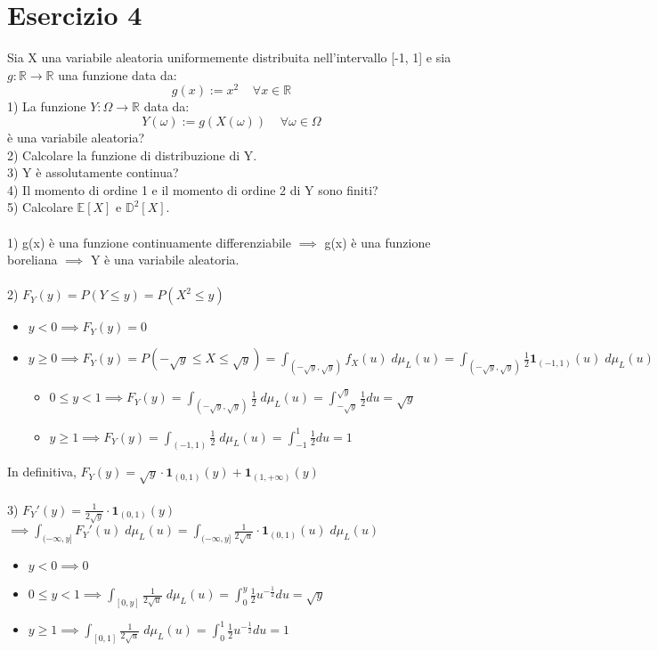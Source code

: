 \documentclass{article}
\begin{document}
\section*{Esercizio 4}
Sia X una variabile aleatoria uniformemente distribuita nell'intervallo [-1, 1] e sia $g: \mathbb{R} \to \mathbb{R}$ una funzione data da:
\[ g(x) := x^{2} \; \; \; \; \forall x \in \mathbb{R} \]
1) La funzione $Y: \Omega \to \mathbb{R}$ data da:
\[ Y(\omega) := g(X(\omega)) \; \; \; \; \forall \omega \in \Omega \]
è una variabile aleatoria?\\
2) Calcolare la funzione di distribuzione di Y.\\
3) Y è assolutamente continua?\\
4) Il momento di ordine 1 e il momento di ordine 2 di Y sono finiti?\\
5) Calcolare $\mathbb{E}[X]$ e $\mathbb{D}^{2}[X]$.\\
\\
1) g(x) è una funzione continuamente differenziabile $\implies$ g(x) è una funzione boreliana $\implies$ Y è una variabile aleatoria.\\
\\
2) $F_{Y}(y) = P(Y \leq y) = P(X^{2} \leq y)$
\begin{itemize}
\item $y<0 \implies F_{Y}(y)=0$
\item $y\geq 0 \implies  F_{Y}(y)= P(-\sqrt{y} \leq X \leq \sqrt{y}) = \int_{(-\sqrt{y},\sqrt{y})}^{}f_{X}(u) \; d\mu_{L}(u) = \int_{(-\sqrt{y},\sqrt{y})}^{}\frac{1}{2}\mathbf{1}_{(-1,1)}(u) \; d\mu_{L}(u)$
	\begin{itemize}
	\item $0 \leq y<1 \implies F_{Y}(y)=\int_{(-\sqrt{y},\sqrt{y})}^{}\frac{1}{2} \; d\mu_{L}(u) = \int_{-\sqrt{y}}^{\sqrt{y}}\frac{1}{2}du = \sqrt{y}$
	\item $y \geq 1 \implies F_{Y}(y)=\int_{(-1,1)}^{}\frac{1}{2} \; d\mu_{L}(u) = \int_{-1}^{1}\frac{1}{2}du = 1$
	\end{itemize}
\end{itemize}
In definitiva, $F_{Y}(y) = \sqrt{y}\cdot \mathbf{1}_{(0,1)}(y)+\mathbf{1}_{(1,+\infty)}(y)$\\
\\
3) $F_{Y}'(y) = \frac{1}{2\sqrt{y}}\cdot \mathbf{1}_{(0,1)}(y)$\\
$\implies \int_{(-\infty,y]}^{}F_{Y}'(u) \; d\mu_{L}(u) = \int_{(-\infty,y]}^{}\frac{1}{2\sqrt{u}}\cdot \mathbf{1}_{(0,1)}(u) \; d\mu_{L}(u)$
\begin{itemize}
\item $y<0 \implies 0$
\item $0 \leq y<1 \implies \int_{[0,y]}^{}\frac{1}{2\sqrt{u}} \; d\mu_{L}(u) = \int_{0}^{y}\frac{1}{2}u^{-\frac{1}{2}}du = \sqrt{y}$
\item $y \geq 1 \implies \int_{[0,1]}^{}\frac{1}{2\sqrt{u}} \; d\mu_{L}(u) = \int_{0}^{1}\frac{1}{2}u^{-\frac{1}{2}}du = 1$
\end{itemize}
\end{document}
